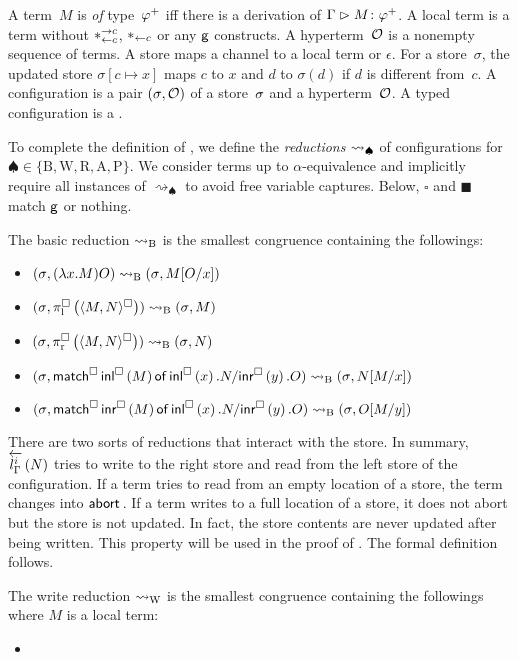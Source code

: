 {A term~$M$ is \textit{of} type~$\m\varphi$ iff there is a derivation of
$\Gamma\tr
\tj{M}{\m\varphi}$.
A local term is a term
without $\comod c c$,
$\reader c$ or any $\g$ constructs.
A hyperterm~$\hypert$ is a nonempty sequence of terms.
A store maps a channel to a
local term or $\epsilon$.
For a store~$\sigma$, the updated store $\sigma[c\mapsto x]$ maps $c$ to
$x$ and $d$ to $\sigma(d)$ if $d$ is different from~$c$.
A configuration is a pair $\conf{}\hypert$ of a
store~$\lstore$ and a hyperterm~$\hypert$.
A typed configuration is a .

To complete the definition of \lgd,
 we define the \textit{reductions} $\reduce_\spadesuit$ of
 configurations for $\spadesuit\in\{\mathrm B, \mathrm W, \mathrm R, \mathrm A,
 \mathrm P\}$.
 We consider terms up to $\alpha$-equivalence and implicitly
 require all instances
 of $\rightsquigarrow_\spadesuit$ to avoid free variable captures.
 Below, $\square$ and $\blacksquare$ match $\g$ or nothing.

\begin{definition}
 The basic reduction $\breduce$ is the smallest congruence containing
 the followings:
 \begin{itemize}
  \item  $\conf{}{(\lambda x.M)O}\breduce
 \conf{}{M[O/x]}$
  \item $\conf{}{\spil{\spair{M,N}}} \breduce
	 \conf{}{           M   }$
  \item $\conf{}{\spir{\spair{M,N}}} \breduce
	 \conf{}{             N }$
  \item $\conf{}{\smat{\sinl M}x N y O} \breduce
	 \conf{}{              N[M/x]}$
  \item $\conf{}{\smat{\sinr M}x N y O} \breduce
	 \conf{}{                  O[M/y]}$
 \end{itemize}
\end{definition}

There are two sorts of reductions that interact with the store.
In summary, $\rtol i l \Gamma N$ tries to write to the right store and read from
the left store of the configuration.
If a term tries to read from an empty location of a store,
the term changes into $\abort$.  If a term writes to a full location of
a store, it does not abort but the store is not updated.  In fact, the
store contents are never updated after being written.
This property will be used in the proof of .
The formal definition follows.
\begin{definition}
 The write reduction $\wreduce$ is the smallest congruence
 containing the followings where $M$ is a local term:
 \begin{itemize}
  \item {}
 \end{itemize}
\end{definition}

}
